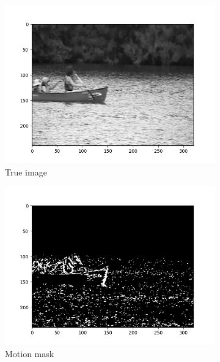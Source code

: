\begin{figure}[!ht]
    \centering
    \begin{subfigure}{.3\textwidth}
        \includegraphics[width=\textwidth]{canoe_frame_100.png}
        \caption{True image}
    \end{subfigure}
    \hfill
    \begin{subfigure}{.3\textwidth}
        \includegraphics[width=\textwidth]{canoe_motion_frame_100.png}
        \caption{Motion mask}
    \end{subfigure}
    \hfill
    \begin{subfigure}{.3\textwidth}

\end{subfigure}
\end{figure}
